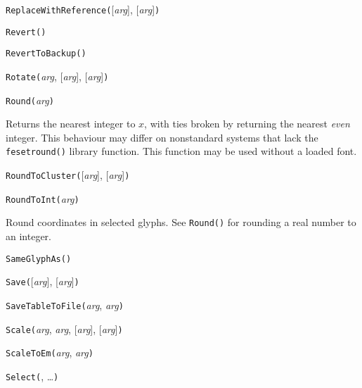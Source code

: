 
\noindent\texttt{ReplaceWithReference(}[\textit{arg}], [\textit{arg}]\texttt{)}


\noindent\texttt{Revert(}\texttt{)}


\noindent\texttt{RevertToBackup(}\texttt{)}


\noindent\texttt{Rotate(}\textit{arg}, [\textit{arg}], [\textit{arg}]\texttt{)}


\noindent\texttt{Round(}\textit{arg}\texttt{)}

Returns the nearest integer to $x$, with ties broken by returning the
nearest \emph{even} integer.  This behaviour may differ on nonstandard
systems that lack the \texttt{fesetround()} library function.
This function may be used without a loaded font.


\noindent\texttt{RoundToCluster(}[\textit{arg}], [\textit{arg}]\texttt{)}


\noindent\texttt{RoundToInt(}\textit{arg}\texttt{)}

Round coordinates in selected glyphs.  See \texttt{Round()} for rounding a
real number to an integer.


\noindent\texttt{SameGlyphAs(}\texttt{)}


\noindent\texttt{Save(}[\textit{arg}], [\textit{arg}]\texttt{)}


\noindent\texttt{SaveTableToFile(}\textit{arg}, \textit{arg}\texttt{)}


\noindent\texttt{Scale(}\textit{arg}, \textit{arg}, [\textit{arg}], [\textit{arg}]\texttt{)}


\noindent\texttt{ScaleToEm(}\textit{arg}, \textit{arg}\texttt{)}


\noindent\texttt{Select(}, \ldots\texttt{)}


